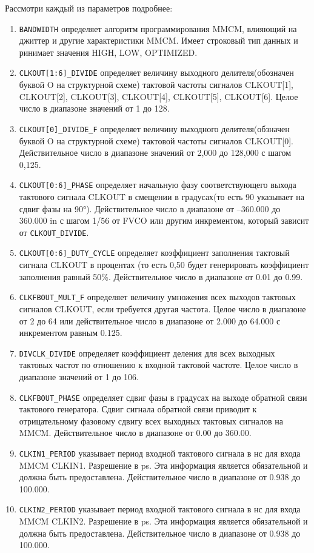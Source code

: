 \documentclass[a4paper,oneside ,10pt]{extreport}
\begin{document}
Рассмотри каждый из параметров подробнее:

\begin{enumerate}
	\item \verb|BANDWIDTH| определяет алгоритм программирования MMCM, влияющий на джиттер и другие характеристики MMCM. Имеет строковый тип данных и ринимает значения HIGH, LOW, OPTIMIZED.		
	\item \verb|CLKOUT[1:6]_DIVIDE|	 
	определяет величину выходного делителя(обозначен буквой O на структурной схеме) 
	тактовой частоты сигналов CLKOUT[1], CLKOUT[2], CLKOUT[3], CLKOUT[4], CLKOUT[5], CLKOUT[6]. 
	Целое число в диапазоне значений от 1 до 128.
	\item \verb|CLKOUT[0]_DIVIDE_F| определяет величину выходного делителя(обзначен буквой O на структурной схеме) тактовой частоты сигналов CLKOUT[0]. Действительное число в диапазоне значений от 2,000 до 128,000 с шагом 0,125. 	
	\item \verb|CLKOUT[0:6]_PHASE| определяет начальную фазу соответствующего выхода тактового сигнала CLKOUT в смещении в градусах(то есть 90 указывает на сдвиг фазы на 90°). Действительное число в диапазоне от –360.000 до 360.000 in
с шагом 1/56 от FVCO или другим инкрементом, который зависит от \verb|CLKOUT_DIVIDE|.
	\item \verb|CLKOUT[0:6]_DUTY_CYCLE| определяет коэффициент заполнения тактовый сигнала CLKOUT в процентах (то есть 0,50 будет генерировать коэффициент заполнения равный 50\%. Действительное число в диапазоне от 0.01 до 0.99. 
	\item \verb|CLKFBOUT_MULT_F| определяет величину умножения всех выходов тактовых сигналов CLKOUT, если требуется другая частота. Целое число в диапазоне от 2 до 64 или действительное число в диапазоне от 2.000 до 64.000 с инкрементом равным 0.125. 
	\item \verb|DIVCLK_DIVIDE| определяет коэффициент деления для всех выходных тактовых частот по отношению к входной тактовой частоте. Целое число в диапазоне значений от 1 до 106.	
	\item \verb|CLKFBOUT_PHASE| определяет сдвиг фазы в градусах на выходе обратной связи тактового генератора. Сдвиг сигнала обратной связи приводит к отрицательному фазовому сдвигу всех выходных тактовых сигналов на MMCM. Действительное число в диапазоне от 0.00 до 360.00.
	\item \verb|CLKIN1_PERIOD| указывает период входной тактового сигнала в нс для входа MMCM CLKIN1. Разрешение в ps. Эта информация является обязательной и должна быть предоставлена. Действительное число в диапазоне от 0.938 до 100.000. 		
	\item \verb|CLKIN2_PERIOD| указывает период входной тактового сигнала в нс для входа MMCM CLKIN2. Разрешение в ps. Эта информация является обязательной и должна быть предоставлена. Действительное число в диапазоне от 0.938 до 100.000.	
\end{enumerate}
\end{document}
